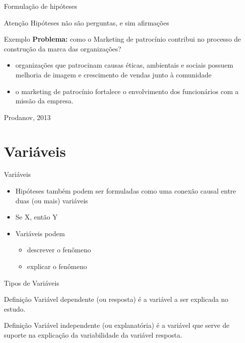 \documentclass{beamer}
\begin{document}
\begin{frame}{Formulação de hipóteses}
  \begin{block}{Atenção}
    Hipóteses não são perguntas, e sim afirmações
  \end{block}

  \begin{exampleblock}{Exemplo}
    \footnotesize
    {\bf Problema:} como o Marketing de patrocínio
    contribui no processo de construção da marca das organizações?

    \begin{itemize}
      \scriptsize
    \item organizações que patrocinam causas éticas, ambientais e
      sociais possuem melhoria de imagem e crescimento de vendas junto
      à comunidade
    \item o marketing de patrocínio fortalece o envolvimento dos
      funcionários com a missão da empresa.
    \end{itemize}

    \vfill
    \scriptsize
    \hfill Prodanov, 2013
\end{exampleblock}
\end{frame}

\section{Variáveis}

\begin{frame}{Variáveis}
  \begin{itemize}
    \footnotesize
  \item Hipóteses também podem ser formuladas como uma conexão causal
    entre duas (ou mais) variáveis
    \bigskip
  \item Se X, então Y
    \bigskip
  \item Variáveis podem
    \begin{itemize}
      \scriptsize
    \item descrever o fenômeno
    \item explicar o fenômeno
    \end{itemize}
  \end{itemize}
\end{frame}

\begin{frame}{Tipos de Variáveis}
  \begin{block}{Definição}
    Variável \alert{dependente} (ou resposta) é a variável a ser
    explicada no estudo.
  \end{block}
  \begin{block}{Definição}
    Variável \alert{independente} (ou explanatória) é a variável que
    serve de suporte na explicação da variabilidade da variável
    resposta.
  \end{block}
\end{frame}
\end{document}
